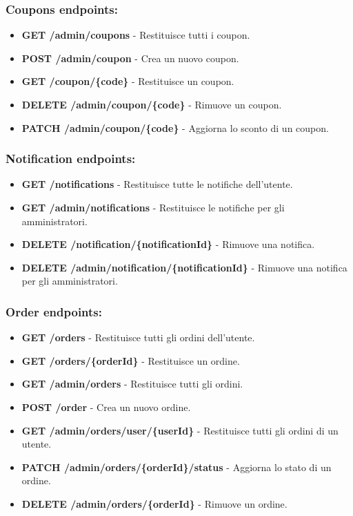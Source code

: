\subsubsection{Coupons endpoints:}
\begin{itemize}
    \item \textbf{GET /admin/coupons} - Restituisce tutti i coupon.
    \item \textbf{POST /admin/coupon} - Crea un nuovo coupon.
    \item \textbf{GET /coupon/\{code\}} - Restituisce un coupon.
    \item \textbf{DELETE /admin/coupon/\{code\}} - Rimuove un coupon.
    \item \textbf{PATCH /admin/coupon/\{code\}} - Aggiorna lo sconto di un coupon.
\end{itemize}

\subsubsection{Notification endpoints:}
\begin{itemize}
    \item \textbf{GET /notifications} - Restituisce tutte le notifiche dell'utente.
    \item \textbf{GET /admin/notifications} - Restituisce le notifiche per gli amministratori.
    \item \textbf{DELETE /notification/\{notificationId\}} - Rimuove una notifica.
    \item \textbf{DELETE /admin/notification/\{notificationId\}} - Rimuove una notifica per gli amministratori.
\end{itemize}

\subsubsection{Order endpoints:}
\begin{itemize}
    \item \textbf{GET /orders} - Restituisce tutti gli ordini dell'utente.
    \item \textbf{GET /orders/\{orderId\}} - Restituisce un ordine.
    \item \textbf{GET /admin/orders} - Restituisce tutti gli ordini.
    \item \textbf{POST /order} - Crea un nuovo ordine.
    \item \textbf{GET /admin/orders/user/\{userId\}} - Restituisce tutti gli ordini di un utente.
    \item \textbf{PATCH /admin/orders/\{orderId\}/status} - Aggiorna lo stato di un ordine.
    \item \textbf{DELETE /admin/orders/\{orderId\}} - Rimuove un ordine.
\end{itemize}

